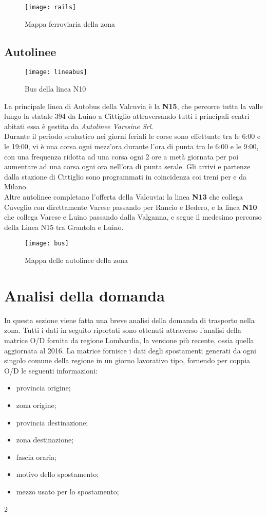 \documentclass{article}
\begin{document}
\begin{figure}[H]
\centering
\texttt{[image: rails]}
\caption{Mappa ferroviaria della zona \cite{orm}}
\end{figure}
\newpage
\subsection{Autolinee}
\begin{figure}[H]
\centering
\texttt{[image: lineabus]}
\caption{Bus della linea N10}
\end{figure}
La principale linea di Autobus della Valcuvia è la \textbf{N15}, che percorre tutta la valle lungo la statale 394 da Luino a Cittiglio attraversando tutti i principali centri abitati essa è gestita da \textit{Autolinee Varesine Srl}.\\
Durante il periodo scolastico nei giorni feriali le corse sono effettuate tra le 6:00 e le 19:00, vi è una corsa ogni mezz'ora durante l'ora di punta tra le 6:00 e le 9:00, con una frequenza ridotta ad una corsa ogni 2 ore a metà giornata per poi aumentare ad una corsa ogni ora nell'ora di punta serale. Gli arrivi e partenze dalla stazione di Cittiglio sono programmati in coincidenza coi treni per e da Milano.\\
Altre autolinee completano l'offerta della Valcuvia: la linea \textbf{N13} che collega Cuveglio con direttamente Varese passando per Rancio e Bedero, e la linea \textbf{N10} che collega Varese e Luino passando dalla Valganna, e segue il medesimo percorso della Linea N15 tra Grantola e Luino.
\begin{figure}[H]
\centering
\texttt{[image: bus]}
\caption{Mappa delle autolinee della zona \cite{va}}
\end{figure}
\newpage

\section{Analisi della domanda}
In questa sezione viene fatta una breve analisi della domanda di trasporto nella zona. Tutti i dati in seguito riportati sono ottenuti attraverso l'analisi della matrice O/D fornita da regione Lombardia, la versione più recente, ossia quella aggiornata al 2016. La matrice fornisce i dati degli spostamenti generati da ogni singolo comune della regione in un giorno lavorativo tipo, fornendo per coppia O/D le seguenti informazioni:
 \begin{multicols}{2}
 \begin{itemize}
\item provincia origine;
\item zona origine;
\item provincia destinazione;
\item zona destinazione;
\item fascia oraria;
\item motivo dello spostamento;
\item mezzo usato per lo spostamento;
\end{itemize}
\end{multicols}{2}
\end{document}
